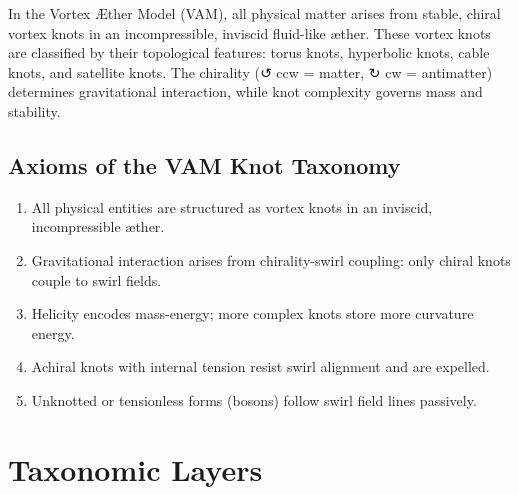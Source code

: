 \documentclass[12pt]{article}
\begin{document}
In the Vortex Æther Model (VAM), all physical matter arises from stable, chiral vortex knots in an incompressible, inviscid fluid-like æther. These vortex knots are classified by their topological features: torus knots, hyperbolic knots, cable knots, and satellite knots. The chirality (↺ ccw = matter, ↻ cw = antimatter) determines gravitational interaction, while knot complexity governs mass and stability.

\subsection*{Axioms of the VAM Knot Taxonomy}
\begin{enumerate}
    \item All physical entities are structured as vortex knots in an inviscid, incompressible æther.
    \item Gravitational interaction arises from chirality-swirl coupling: only chiral knots couple to swirl fields.
    \item Helicity encodes mass-energy; more complex knots store more curvature energy.
    \item Achiral knots with internal tension resist swirl alignment and are expelled.
    \item Unknotted or tensionless forms (bosons) follow swirl field lines passively.
\end{enumerate}

\begin{center}
\end{center}

\section*{Taxonomic Layers}
\end{document}
